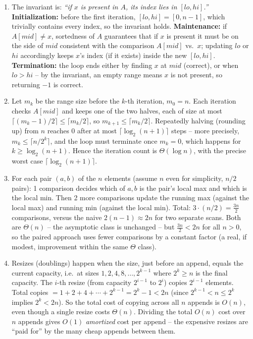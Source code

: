 \documentclass[11pt]{article}
\begin{document}
\begin{enumerate}[label=\textbf{A\arabic*.}, leftmargin=2.2em]
\item The invariant is: \emph{``if $x$ is present in $A$, its index lies in
$[lo, hi]$.''} \textbf{Initialization:} before the first iteration, $[lo,hi]=[0,n-1]$,
which trivially contains every index, so the invariant holds. \textbf{Maintenance:} if
$A[mid] \ne x$, sortedness of $A$ guarantees that if $x$ is present it must be on the side
of $mid$ consistent with the comparison $A[mid]$ vs.\ $x$; updating $lo$ or $hi$
accordingly keeps $x$'s index (if it exists) inside the new $[lo,hi]$. \textbf{Termination:}
the loop ends either by finding $x$ at $mid$ (correct), or when $lo > hi$ -- by the
invariant, an empty range means $x$ is not present, so returning $-1$ is correct.

\item Let $m_k$ be the range size before the $k$-th iteration, $m_0 = n$. Each iteration
checks $A[mid]$ and keeps one of the two halves, each of size at most $\lceil (m_k-1)/2
\rceil \le \lceil m_k/2 \rceil$, so $m_{k+1} \le \lceil m_k/2 \rceil$. Repeatedly halving
(rounding up) from $n$ reaches $0$ after at most $\lceil \log_2(n+1) \rceil$ steps -- more
precisely, $m_k \le \lceil n/2^k \rceil$, and the loop must terminate once $m_k = 0$, which
happens for $k \ge \log_2(n+1)$. Hence the iteration count is $\Theta(\log n)$, with the
precise worst case $\lceil \log_2(n+1) \rceil$.

\item For each pair $(a,b)$ of the $n$ elements (assume $n$ even for simplicity, $n/2$
pairs): 1 comparison decides which of $a,b$ is the pair's local max and which is the local
min. Then 2 more comparisons update the running max (against the local max) and running
min (against the local min). Total: $3 \cdot (n/2) = \frac{3n}{2}$ comparisons, versus the
naive $2(n-1) \approx 2n$ for two separate scans. Both are $\Theta(n)$ -- the asymptotic
class is unchanged -- but $\frac{3n}{2} < 2n$ for all $n>0$, so the paired approach uses
fewer comparisons by a constant factor (a real, if modest, improvement within the same
$\Theta$ class).

\item Resizes (doublings) happen when the size, just before an append, equals the current
capacity, i.e.\ at sizes $1, 2, 4, 8, \ldots, 2^{k-1}$ where $2^k \ge n$ is the final
capacity. The $i$-th resize (from capacity $2^{i-1}$ to $2^i$) copies $2^{i-1}$ elements.
Total copies $= 1+2+4+\cdots+2^{k-1} = 2^k - 1 < 2n$ (since $2^{k-1} < n \le 2^k$ implies
$2^k < 2n$). So the total cost of copying across all $n$ appends is $O(n)$, even though a
single resize costs $\Theta(n)$. Dividing the total $O(n)$ cost over $n$ appends gives
$O(1)$ \emph{amortized} cost per append -- the expensive resizes are ``paid for'' by the
many cheap appends between them.


\end{enumerate}
\end{document}
